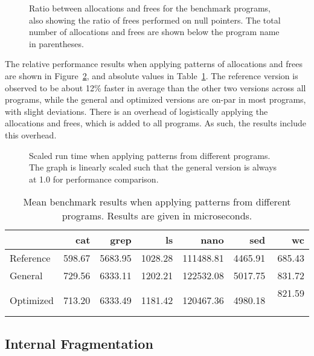 \begin{figure}[H]
    \centering
    
    \caption{Ratio between allocations and frees for the benchmark programs, also showing the ratio of frees performed on null pointers. The total number of allocations and frees are shown below the program name in parentheses.}
    \label{fig:program_ratios}
\end{figure}

The relative performance results when applying patterns of allocations and frees are shown in Figure~\ref{fig:program_benchmarks}, and absolute values in Table~\ref{table:program_benchmarks}. The reference version is observed to be about 12\% faster in average than the other two versions across all programs, while the general and optimized versions are on-par in most programs, with slight deviations. There is an overhead of logistically applying the allocations and frees, which is added to all programs. As such, the results include this overhead. 

\begin{figure}[H]
    \centering
    
    \caption{Scaled run time when applying patterns from different programs. The graph is linearly scaled such that the general version is always at 1.0 for performance comparison.}
    \label{fig:program_benchmarks}
\end{figure}

\begin{table}[H]
    \centering
    \begin{tabular}{lrrrrrr}
    {} & {cat} & {grep} & {ls} & {nano} & {sed} & {wc} \\
    \midrule
    Reference & 598.67 & 5683.95 & 1028.28 & 111488.81 & 4465.91 & 685.43 \\
    General & 729.56 & 6333.11 & 1202.21 & 122532.08 & 5017.75 & 831.72 \\
    Optimized & 713.20 & 6333.49 & 1181.42 & 120467.36 & 4980.18 & 821.59 \
    \end{tabular}
    \caption{Mean benchmark results when applying patterns from different programs. Results are given in microseconds.}
    \label{table:program_benchmarks}
\end{table}

\subsection{Internal Fragmentation}


